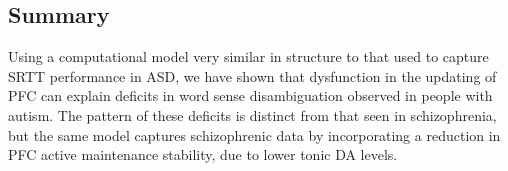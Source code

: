 \subsection{Summary}

Using a computational model very similar in structure to that used to capture SRTT performance in ASD, we have shown that dysfunction in the updating of PFC can explain deficits in word sense disambiguation observed in people with autism. The pattern of these deficits is distinct from that seen in schizophrenia, but the same model captures schizophrenic data by incorporating a reduction in PFC active maintenance stability, due to lower tonic DA levels.

